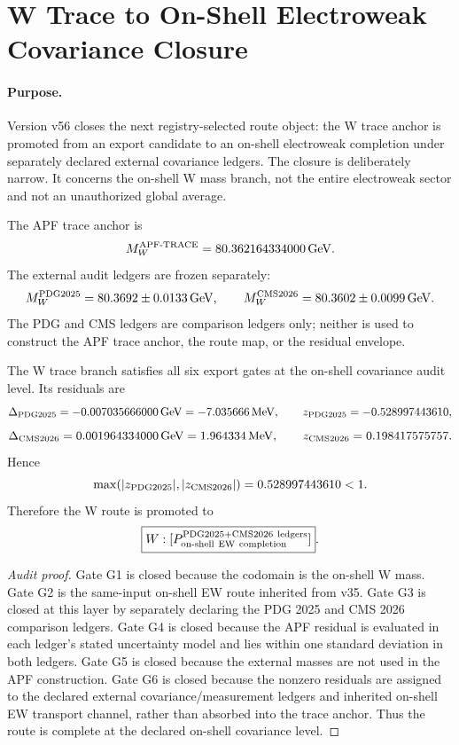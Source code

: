 \section{W Trace to On-Shell Electroweak Covariance Closure}
\label{sec:w-onshell-ew-covariance-closure-v56}

\paragraph{Purpose.}
Version v56 closes the next registry-selected route object: the W trace anchor
is promoted from an export candidate to an on-shell electroweak completion under
separately declared external covariance ledgers.  The closure is deliberately
narrow.  It concerns the on-shell W mass branch, not the entire electroweak
sector and not an unauthorized global average.

\begin{definition}
The APF trace anchor is
\[
M_W^{\rm APF\text{-}TRACE}=80.362164334000\,{\rm GeV}.
\]
The external audit ledgers are frozen separately:
\[
M_W^{\rm PDG2025}=80.3692\pm 0.0133\,{\rm GeV},
\qquad
M_W^{\rm CMS2026}=80.3602\pm 0.0099\,{\rm GeV}.
\]
The PDG and CMS ledgers are comparison ledgers only; neither is used to construct
the APF trace anchor, the route map, or the residual envelope.
\end{definition}

\begin{theorem}
The W trace branch satisfies all six export gates at the on-shell covariance
audit level.  Its residuals are
\[
\Delta_{\rm PDG2025}=-0.007035666000\,{\rm GeV}
= -7.035666\,{\rm MeV},
\qquad
z_{\rm PDG2025}=-0.528997443610,
\]
\[
\Delta_{\rm CMS2026}=0.001964334000\,{\rm GeV}
= 1.964334\,{\rm MeV},
\qquad
z_{\rm CMS2026}=0.198417575757.
\]
Hence
\[
\max(|z_{\rm PDG2025}|,|z_{\rm CMS2026}|)=0.528997443610<1.
\]
Therefore the W route is promoted to
\[
\boxed{W:[P_{\rm on\text{-}shell\ EW\ completion}^{\rm PDG2025+CMS2026\ ledgers}]}.
\]
\end{theorem}

\begin{proof}[Audit proof]
Gate G1 is closed because the codomain is the on-shell W mass.  Gate G2 is the
same-input on-shell EW route inherited from v35.  Gate G3 is closed at this
layer by separately declaring the PDG 2025 and CMS 2026 comparison ledgers.  Gate
G4 is closed because the APF residual is evaluated in each ledger's stated
uncertainty model and lies within one standard deviation in both ledgers.  Gate
G5 is closed because the external masses are not used in the APF construction.
Gate G6 is closed because the nonzero residuals are assigned to the declared
external covariance/measurement ledgers and inherited on-shell EW transport
channel, rather than absorbed into the trace anchor.  Thus the route is complete
at the declared on-shell covariance level.
\end{proof}

